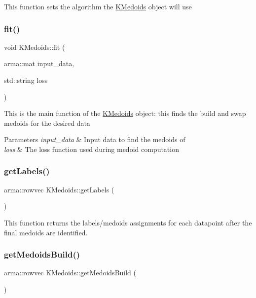 This function sets the algorithm the \hyperlink{classKMedoids}{K\+Medoids} object will use \mbox{\label{classKMedoids_ab68f7ee100ab2a15bc6ee0ba28f128ba}} 
\subsubsection{\texorpdfstring{fit()}{fit()}}
{\footnotesize\ttfamily void K\+Medoids\+::fit (\begin{DoxyParamCaption}\item[{arma\+::mat}]{input\+\_\+data,  }\item[{std\+::string}]{loss }\end{DoxyParamCaption})}

This is the main function of the \hyperlink{classKMedoids}{K\+Medoids} object\+: this finds the build and swap medoids for the desired data


\begin{DoxyParams}{Parameters}
{\em input\+\_\+data} & Input data to find the medoids of \\
\hline
{\em loss} & The loss function used during medoid computation \\
\hline
\end{DoxyParams}
\mbox{\label{classKMedoids_a89474787892880381e4d0282de541d03}} 
\subsubsection{\texorpdfstring{get\+Labels()}{getLabels()}}
{\footnotesize\ttfamily arma\+::rowvec K\+Medoids\+::get\+Labels (\begin{DoxyParamCaption}{ }\end{DoxyParamCaption})}

This function returns the labels/medoids assignments for each datapoint after the final medoids are identified. \mbox{\label{classKMedoids_a54370d8d0f5c500f5deb859a9eab891c}} 
\subsubsection{\texorpdfstring{get\+Medoids\+Build()}{getMedoidsBuild()}}
{\footnotesize\ttfamily arma\+::rowvec K\+Medoids\+::get\+Medoids\+Build (\begin{DoxyParamCaption}{ }\end{DoxyParamCaption})}

